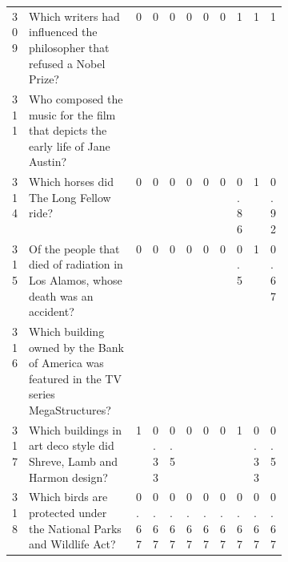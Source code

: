 \begin{longtable}{@{}lp{0.4\linewidth}lllllllll@{}}
309      & Which writers had influenced the philosopher that refused a Nobel Prize?                                    & \cellcolor[HTML]{FFFE65}0   & \cellcolor[HTML]{FFFE65}0    & \cellcolor[HTML]{FFFE65}0    & \cellcolor[HTML]{FFFE65}0 & \cellcolor[HTML]{FFFE65}0 & \cellcolor[HTML]{FFFE65}0 & 1                        & 1                        & 1                        \\
311      & Who composed the music for the film that depicts the early life of Jane Austin?                             & \cellcolor[HTML]{FE0000}   & \cellcolor[HTML]{FE0000}    & \cellcolor[HTML]{FE0000}    & \cellcolor[HTML]{FE0000} & \cellcolor[HTML]{FE0000} & \cellcolor[HTML]{FE0000} & \cellcolor[HTML]{FE0000} & \cellcolor[HTML]{FE0000} & \cellcolor[HTML]{FE0000} \\
314      & Which horses did The Long Fellow ride?                                                                      & \cellcolor[HTML]{FFFE65}0   & \cellcolor[HTML]{FFFE65}0    & \cellcolor[HTML]{FFFE65}0    & \cellcolor[HTML]{FFFE65}0 & \cellcolor[HTML]{FFFE65}0 & \cellcolor[HTML]{FFFE65}0 & 0.86                     & 1                        & 0.92                     \\
315      & Of the people that died of radiation in Los Alamos, whose death was an accident?                            & \cellcolor[HTML]{FFFE65}0   & \cellcolor[HTML]{FFFE65}0    & \cellcolor[HTML]{FFFE65}0    & \cellcolor[HTML]{FFFE65}0 & \cellcolor[HTML]{FFFE65}0 & \cellcolor[HTML]{FFFE65}0 & 0.5                      & 1                        & 0.67                     \\
316      & Which building owned by the Bank of America was featured in the TV series MegaStructures?                   & \cellcolor[HTML]{FE0000}   & \cellcolor[HTML]{FE0000}    & \cellcolor[HTML]{FE0000}    & \cellcolor[HTML]{FE0000} & \cellcolor[HTML]{FE0000} & \cellcolor[HTML]{FE0000} & \cellcolor[HTML]{FE0000} & \cellcolor[HTML]{FE0000} & \cellcolor[HTML]{FE0000} \\
317      & Which buildings in art deco style did Shreve, Lamb and Harmon design?                                       & 1                           & 0.33                         & 0.5                          & \cellcolor[HTML]{F8A102}0 & \cellcolor[HTML]{F8A102}0 & \cellcolor[HTML]{F8A102}0 & 1                        & 0.33                     & 0.5                      \\
318      & Which birds are protected under the National Parks and Wildlife Act?                                        & 0.67                        & 0.67                         & 0.67                         & 0.67                      & 0.67                      & 0.67                      & 0.67                     & 0.67                     & 0.67                     \\

\end{longtable}
